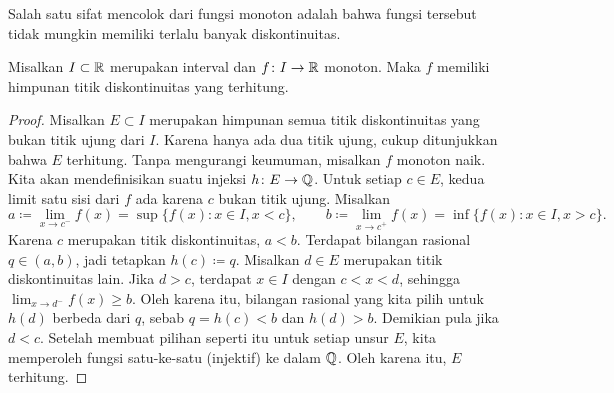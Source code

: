 \begin{myfigureht}
\caption{Diskontinuitas fungsi monoton naik $f \colon I \to \R$ di
$c$.\label{fig:figinccont}}
\end{myfigureht}

Salah satu sifat mencolok dari fungsi monoton adalah bahwa fungsi tersebut tidak mungkin memiliki
terlalu banyak diskontinuitas.

\begin{cor} \label{cor:monotcountcont}
Misalkan $I \subset {\mathbb{R}}$ merupakan interval dan
$f \colon I \to \R$ monoton.  Maka $f$ memiliki himpunan
titik diskontinuitas yang terhitung.
\end{cor}

\begin{proof}
Misalkan $E \subset I$ merupakan himpunan semua titik diskontinuitas
yang bukan titik ujung dari $I$.  Karena hanya ada
dua titik ujung, cukup ditunjukkan bahwa $E$ terhitung.
Tanpa mengurangi keumuman, misalkan $f$ monoton naik.
Kita akan mendefinisikan suatu injeksi $h \colon E \to {\mathbb{Q}}$.
Untuk setiap $c \in E$,
kedua limit satu sisi dari $f$ ada karena $c$ bukan titik ujung.
Misalkan
\begin{equation*}
a
\coloneqq \lim_{x \to c^-} f(x) = \sup \bigl\{ f(x) : x \in I, x < c \bigr\} ,
\qquad
b
\coloneqq \lim_{x \to c^+} f(x) = \inf \bigl\{ f(x) : x \in I, x > c \bigr\} .
\end{equation*}
Karena $c$ merupakan titik diskontinuitas, $a < b$.  
Terdapat bilangan rasional $q \in (a,b)$, jadi tetapkan $h(c) \coloneqq q$.
Misalkan $d \in E$ merupakan titik diskontinuitas lain.
Jika $d > c$, terdapat
$x \in I$ dengan $c < x < d$, sehingga $\lim_{x \to d^-} f(x) \geq b$.
Oleh karena itu, bilangan rasional yang kita pilih untuk $h(d)$ berbeda dari $q$,
sebab $q=h(c) < b$ dan $h(d) > b$.
Demikian pula jika $d < c$.  Setelah membuat pilihan seperti itu untuk
setiap unsur $E$, kita memperoleh fungsi 
satu-ke-satu (injektif) ke dalam ${\mathbb{Q}}$.  Oleh karena itu, $E$ terhitung.
\end{proof}

